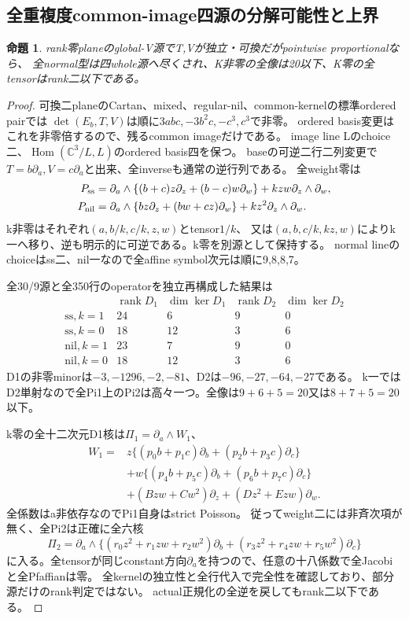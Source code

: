 \documentclass[a4paper,11pt]{ltjsarticle}
\newtheorem{proposition}{命題}[section]
\theoremstyle{definition}
\newcommand{\rank}{\operatorname{rank}}
\begin{document}
\subsection{全重複度common-image四源の分解可能性と上界}
\begin{proposition}\label{prop:plane-commonimage-all-m-G}
rank零planeのglobal-V源でT,Vが独立・可換だがpointwise proportionalなら、
全normal型は四whole源へ尽くされ、K非零の全像は20以下、K零の全tensorはrank二以下である。
\end{proposition}
\begin{proof}
可換二planeのCartan、mixed、regular-nil、common-kernelの標準ordered pairでは
$\det(E_b,T,V)$は順に$3abc,-3b^2c,-c^3,c^3$で非零。
ordered basis変更はこれを非零倍するので、残るcommon imageだけである。
image line Lのchoice二、$\operatorname{Hom}(\mathbb C^3/L,L)$のordered basis四を保つ。
baseの可逆二行二列変更で$T=b\partial_a,V=c\partial_a$と出来、全inverseも通常の逆行列である。
全weight零は
\[
\begin{aligned}
 P_{\rm ss}&=\partial_a\wedge\{(b+c)z\partial_z+(b-c)w\partial_w\}
                   +kzw\partial_z\wedge\partial_w,\\
 P_{\rm nil}&=\partial_a\wedge\{bz\partial_z+(bw+cz)\partial_w\}
                   +kz^2\partial_z\wedge\partial_w.
\end{aligned}
\]
k非零はそれぞれ$(a,b/k,c/k,z,w)$とtensor$1/k$、
又は$(a,b,c/k,kz,w)$によりk一へ移り、逆も明示的に可逆である。k零を別源として保持する。
normal lineのchoiceはss二、nil一なので全affine symbol次元は順に9,8,8,7。

全30/9源と全350行のoperatorを独立再構成した結果は
\[
\begin{array}{c|c|c|c|c}
 &\rank D_1&\dim\ker D_1&\rank D_2&\dim\ker D_2\\\hline
 \mathrm{ss},k=1&24&6&9&0\\
 \mathrm{ss},k=0&18&12&3&6\\
 \mathrm{nil},k=1&23&7&9&0\\
 \mathrm{nil},k=0&18&12&3&6
\end{array}
\]
D1の非零minorは$-3,-1296,-2,-81$、D2は$-96,-27,-64,-27$である。
k一ではD2単射なので全Pi1上のPi2は高々一つ。全像は$9+6+5=20$又は$8+7+5=20$以下。

k零の全十二次元D1核は$\Pi_1=\partial_a\wedge W_1$、
\[
\begin{aligned}
 W_1={}&z\{(p_0b+p_1c)\partial_b+(p_2b+p_3c)\partial_c\}\\
 &+w\{(p_4b+p_5c)\partial_b+(p_6b+p_7c)\partial_c\}\\
 &+(Bzw+Cw^2)\partial_z+(Dz^2+Ezw)\partial_w.
\end{aligned}
\]
全係数はa非依存なのでPi1自身はstrict Poisson。
従ってweight二には非斉次項が無く、全Pi2は正確に全六核
\[
 \Pi_2=\partial_a\wedge\{(r_0z^2+r_1zw+r_2w^2)\partial_b+
                         (r_3z^2+r_4zw+r_5w^2)\partial_c\}
\]
に入る。全tensorが同じconstant方向$\partial_a$を持つので、任意の十八係数で全Jacobiと全Pfaffianは零。
全kernelの独立性と全行代入で完全性を確認しており、部分源だけのrank判定ではない。
actual正規化の全逆を戻してもrank二以下である。
\end{proof}
\end{document}
